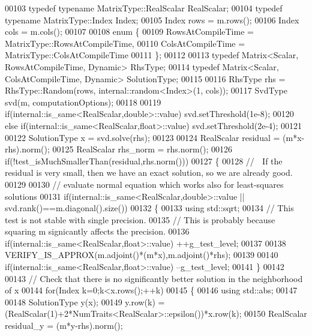 \begin{DoxyCode}
00103   \textcolor{keyword}{typedef} \textcolor{keyword}{typename} MatrixType::RealScalar RealScalar;
00104   \textcolor{keyword}{typedef} \textcolor{keyword}{typename} MatrixType::Index Index;
00105   Index rows = m.rows();
00106   Index cols = m.cols();
00107 
00108   \textcolor{keyword}{enum} \{
00109     RowsAtCompileTime = MatrixType::RowsAtCompileTime,
00110     ColsAtCompileTime = MatrixType::ColsAtCompileTime
00111   \};
00112 
00113   \textcolor{keyword}{typedef} Matrix<Scalar, RowsAtCompileTime, Dynamic> RhsType;
00114   \textcolor{keyword}{typedef} Matrix<Scalar, ColsAtCompileTime, Dynamic> SolutionType;
00115 
00116   RhsType rhs = RhsType::Random(rows, internal::random<Index>(1, cols));
00117   SvdType svd(m, computationOptions);
00118 
00119        \textcolor{keywordflow}{if}(internal::is\_same<RealScalar,double>::value) svd.setThreshold(1e-8);
00120   \textcolor{keywordflow}{else} \textcolor{keywordflow}{if}(internal::is\_same<RealScalar,float>::value)  svd.setThreshold(2e-4);
00121 
00122   SolutionType x = svd.solve(rhs);
00123    
00124   RealScalar residual = (m*x-rhs).norm();
00125   RealScalar rhs\_norm = rhs.norm();
00126   \textcolor{keywordflow}{if}(!test\_isMuchSmallerThan(residual,rhs.norm()))
00127   \{
00128     \textcolor{comment}{// ^^^ If the residual is very small, then we have an exact solution, so we are already good.}
00129     
00130     \textcolor{comment}{// evaluate normal equation which works also for least-squares solutions}
00131     \textcolor{keywordflow}{if}(internal::is\_same<RealScalar,double>::value || svd.rank()==m.diagonal().size())
00132     \{
00133       \textcolor{keyword}{using} std::sqrt;
00134       \textcolor{comment}{// This test is not stable with single precision.}
00135       \textcolor{comment}{// This is probably because squaring m signicantly affects the precision.      }
00136       \textcolor{keywordflow}{if}(internal::is\_same<RealScalar,float>::value) ++g\_test\_level;
00137       
00138       VERIFY\_IS\_APPROX(m.adjoint()*(m*x),m.adjoint()*rhs);
00139       
00140       \textcolor{keywordflow}{if}(internal::is\_same<RealScalar,float>::value) --g\_test\_level;
00141     \}
00142     
00143     \textcolor{comment}{// Check that there is no significantly better solution in the neighborhood of x}
00144     \textcolor{keywordflow}{for}(Index k=0;k<x.rows();++k)
00145     \{
00146       \textcolor{keyword}{using} std::abs;
00147       
00148       SolutionType y(x);
00149       y.row(k) = (RealScalar(1)+2*NumTraits<RealScalar>::epsilon())*x.row(k);
00150       RealScalar residual\_y = (m*y-rhs).norm();

\end{DoxyCode}
